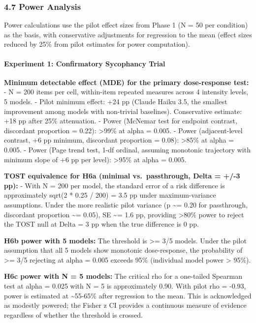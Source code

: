 \documentclass[
  11pt,
]{article}
\begin{document}
\subsubsection{4.7 Power Analysis}\label{power-analysis}

Power calculations use the pilot effect sizes from Phase 1 (N = 50 per
condition) as the basis, with conservative adjustments for regression to
the mean (effect sizes reduced by 25\% from pilot estimates for power
computation).

\paragraph{Experiment 1: Confirmatory Sycophancy
Trial}\label{experiment-1-confirmatory-sycophancy-trial-1}

\textbf{Minimum detectable effect (MDE) for the primary dose-response
test:} - N = 200 items per cell, within-item repeated measures across 4
intensity levels, 5 models. - Pilot minimum effect: +24 pp (Claude Haiku
3.5, the smallest improvement among models with non-trivial baselines).
Conservative estimate: +18 pp after 25\% attenuation. - Power (McNemar
test for endpoint contrast, discordant proportion = 0.22):
\textgreater99\% at alpha = 0.005. - Power (adjacent-level contrast, +6
pp minimum, discordant proportion = 0.08): \textgreater85\% at alpha =
0.005. - Power (Page trend test, 1-df ordinal, assuming monotonic
trajectory with minimum slope of +6 pp per level): \textgreater95\% at
alpha = 0.005.

\textbf{TOST equivalence for H6a (minimal vs.~passthrough, Delta = +/-3
pp):} - With N = 200 per model, the standard error of a risk difference
is approximately sqrt(2 * 0.25 / 200) = 3.5 pp under maximum-variance
assumptions. Under the more realistic pilot variance (p \textasciitilde=
0.20 for passthrough, discordant proportion \textasciitilde= 0.05), SE
\textasciitilde= 1.6 pp, providing \textgreater80\% power to reject the
TOST null at Delta = 3 pp when the true difference is 0 pp.

\textbf{H6b power with 5 models:} The threshold is \textgreater= 3/5
models. Under the pilot assumption that all 5 models show monotonic
dose-response, the probability of \textgreater= 3/5 rejecting at alpha =
0.005 exceeds 95\% (individual model power \textgreater{} 95\%).

\textbf{H6c power with N = 5 models:} The critical rho for a one-tailed
Spearman test at alpha = 0.025 with N = 5 is approximately 0.90. With
pilot rho = -0.93, power is estimated at \textasciitilde55-65\% after
regression to the mean. This is acknowledged as modestly powered; the
Fisher z CI provides a continuous measure of evidence regardless of
whether the threshold is crossed.
\end{document}
